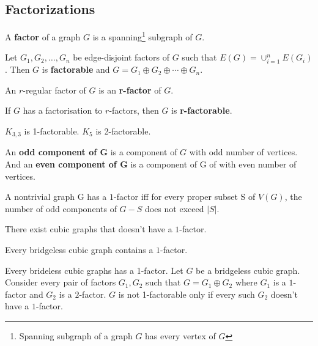 \setcounter{subsection}{3}
\subsection{Factorizations}
\begin{definition}
	A \textbf{factor} of a graph $G$ is a spanning\footnote{Spanning subgraph of a graph $G$ has every vertex of $G$} subgraph of $G$.
\end{definition}

\begin{definition}
	Let $G_1, G_2, \dots, G_n$ be edge-disjoint factors of $G$ such that $E(G) = \cup_{i = 1}^n E(G_i)$.
	Then $G$ is \textbf{factorable} and $G = G_1 \oplus G_2 \oplus \dotsb \oplus G_n$.
\end{definition}

\begin{definition}
	An $r$-regular factor of $G$ is an \textbf{r-factor} of $G$.
\end{definition}

\begin{definition}
	If $G$ has a factorisation to $r$-factors, then $G$ is \textbf{r-factorable}.
\end{definition}

\begin{remark}
	$K_{3,3}$ is 1-factorable.
	$K_5$ is 2-factorable.
\end{remark}

\begin{definition}
	An \textbf{odd component of G} is a component of $G$ with odd number of vertices.
	And an \textbf{even component of G} is a component of G of with even number of vertices.
\end{definition}

\begin{theorem}[Tutte]
	A nontrivial graph G has a $1$-factor iff for every proper subset S of $V(G)$, the number of odd components of $G-S$ does not exceed $|S|$.
\end{theorem}

\begin{remark}
	There exist cubic graphs that doesn't have a $1$-factor.
\end{remark}

\begin{theorem}[Petersen]
	Every bridgeless cubic graph contains a $1$-factor.
\end{theorem}

\begin{remark}
	Every brideless cubic graphs has a 1-factor.
	Let $G$ be a bridgeless cubic graph.
	Consider every pair of factors $G_1, G_2$ such that $G = G_1 \oplus G_2$ where $G_1$ is a $1$-factor and $G_2$ is a $2$-factor.
	$G$ is not 1-factorable only if every such $G_2$ doesn't have a $1$-factor.
\end{remark}

